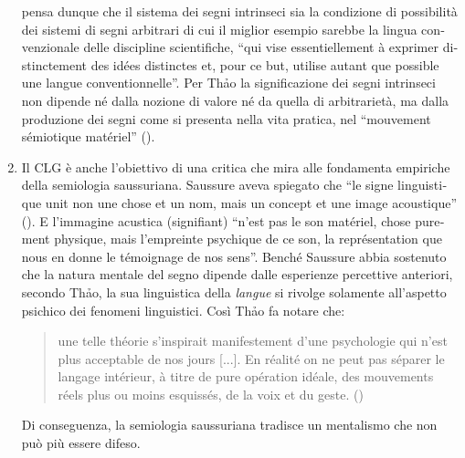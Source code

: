 \documentclass[output=paper]{../langscibook}
\begin{document}
\begin{otherlanguage}{italian}
\begin{enumerate}
\citet[39]{thao_phenomenologie_1974} pensa dunque che il sistema dei segni intrinseci sia la condizione di possibilità dei sistemi di segni arbitrari di cui il miglior esempio sarebbe la lingua convenzionale delle discipline scientifiche, “qui vise essentiellement à exprimer distinctement des idées distinctes et, pour ce but, utilise autant que possible une langue conventionnelle”. Per Th\textlatin{ả}o la significazione dei segni intrinseci non dipende né dalla nozione di valore né da quella di arbitrarietà, ma dalla produzione dei segni come si presenta nella vita pratica, nel “mouvement sémiotique matériel” (\citealt[39]{thao_phenomenologie_1974}). 

\item Il CLG è anche l’obiettivo di una critica che mira alle fondamenta empiriche della semiologia saussuriana. Saussure aveva spiegato che “le signe linguistique unit non une chose et un nom, mais un concept et une image acoustique” (\citealt[98]{saussure_cours_1995}). E l’immagine acustica (signifiant) “n’est pas le son matériel, chose purement physique, mais l’empreinte psychique de ce son, la représentation que nous en donne le témoignage de nos sens”. Benché Saussure abbia sostenuto che la natura mentale del segno dipende dalle esperienze percettive anteriori, secondo Th\textlatin{ả}o, la sua linguistica della \textit{langue} si rivolge solamente all’aspetto psichico dei fenomeni linguistici. Così Th\textlatin{ả}o fa notare che:

\begin{quote} 
    une telle théorie s’inspirait manifestement d’une psychologie qui n’est plus acceptable de nos jours [...]. En réalité on ne peut pas séparer le langage intérieur, à titre de pure opération idéale, des mouvements réels plus ou moins esquissés, de la voix et du geste. (\citealt[25--26]{thao_phenomenologie_1975})
\end{quote}
Di conseguenza, la semiologia saussuriana tradisce un mentalismo che non può più essere difeso.



\end{enumerate}
\end{otherlanguage}
\end{document}
